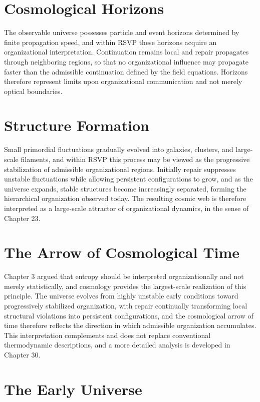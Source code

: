\documentclass[11pt,oneside]{book}
\numberwithin{equation}{chapter}
\theoremstyle{definition}
\theoremstyle{plain}
\begin{document}
\section{Cosmological Horizons}

The observable universe possesses particle and event horizons determined by finite propagation speed, and within RSVP these horizons acquire an organizational interpretation. Continuation remains local and repair propagates through neighboring regions, so that no organizational influence may propagate faster than the admissible continuation defined by the field equations. Horizons therefore represent limits upon organizational communication and not merely optical boundaries.

\section{Structure Formation}

Small primordial fluctuations gradually evolved into galaxies, clusters, and large-scale filaments, and within RSVP this process may be viewed as the progressive stabilization of admissible organizational regions. Initially repair suppresses unstable fluctuations while allowing persistent configurations to grow, and as the universe expands, stable structures become increasingly separated, forming the hierarchical organization observed today. The resulting cosmic web is therefore interpreted as a large-scale attractor of organizational dynamics, in the sense of Chapter 23.

\section{The Arrow of Cosmological Time}

Chapter 3 argued that entropy should be interpreted organizationally and not merely statistically, and cosmology provides the largest-scale realization of this principle. The universe evolves from highly unstable early conditions toward progressively stabilized organization, with repair continually transforming local structural violations into persistent configurations, and the cosmological arrow of time therefore reflects the direction in which admissible organization accumulates. This interpretation complements and does not replace conventional thermodynamic descriptions, and a more detailed analysis is developed in Chapter 30.

\section{The Early Universe}
\end{document}
